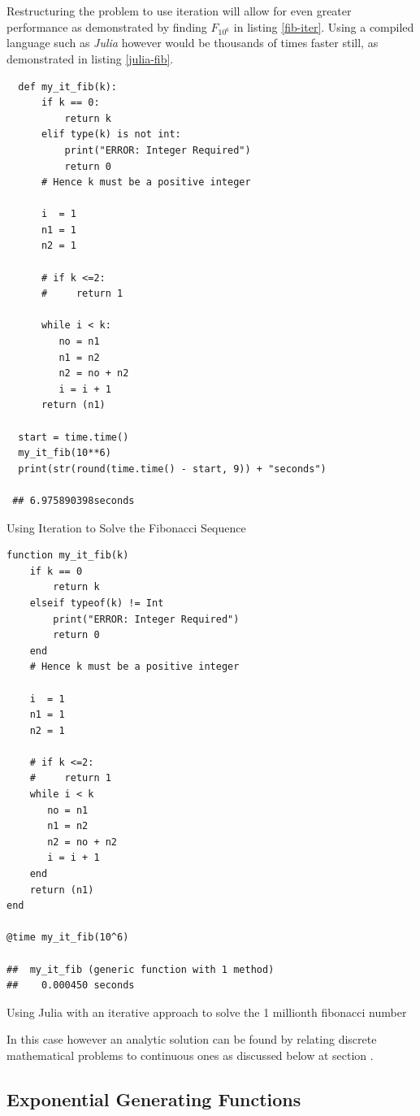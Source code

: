 \documentclass[a4paper,11pt,twoside]{article}
\begin{document}
Restructuring the problem to use iteration will allow for even greater performance as demonstrated by finding \(F_{10^{6}}\) in listing \ref{fib-iter}. Using a compiled language such as \emph{Julia} however would be thousands of times faster still, as demonstrated in listing \ref{julia-fib}.



\begin{listing}[htbp]
\begin{verbatim}
  def my_it_fib(k):
      if k == 0:
          return k
      elif type(k) is not int:
          print("ERROR: Integer Required")
          return 0
      # Hence k must be a positive integer

      i  = 1
      n1 = 1
      n2 = 1

      # if k <=2:
      #     return 1

      while i < k:
         no = n1
         n1 = n2
         n2 = no + n2
         i = i + 1
      return (n1)

  start = time.time()
  my_it_fib(10**6)
  print(str(round(time.time() - start, 9)) + "seconds")

 ## 6.975890398seconds
\end{verbatim}
\caption{\label{fib-iter}Using Iteration to Solve the Fibonacci Sequence}
\end{listing}

\begin{listing}[htbp]
\begin{verbatim}
function my_it_fib(k)
    if k == 0
        return k
    elseif typeof(k) != Int
        print("ERROR: Integer Required")
        return 0
    end
    # Hence k must be a positive integer

    i  = 1
    n1 = 1
    n2 = 1

    # if k <=2:
    #     return 1
    while i < k
       no = n1
       n1 = n2
       n2 = no + n2
       i = i + 1
    end
    return (n1)
end

@time my_it_fib(10^6)

##  my_it_fib (generic function with 1 method)
##    0.000450 seconds
\end{verbatim}
\caption{\label{julia-fib}Using Julia with an iterative approach to solve the 1 millionth fibonacci number}
\end{listing}

In this case however an analytic solution can be found by relating discrete
mathematical problems to continuous ones as discussed below at section .
\subsection{Exponential Generating Functions}
\label{exp-gen-func-fib-seq}
\end{document}
